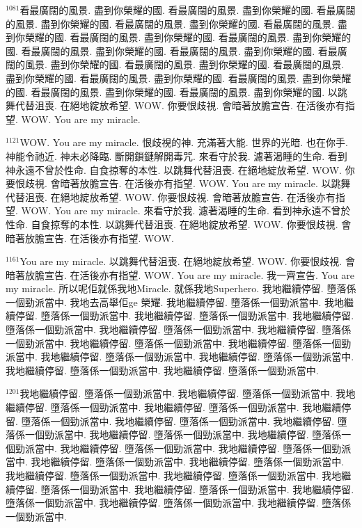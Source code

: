 \documentclass{book}
\begin{document}
$^{1081}$看最廣闊的風景.
盡到你榮耀的國.
看最廣闊的風景.
盡到你榮耀的國.
看最廣闊的風景.
盡到你榮耀的國.
看最廣闊的風景.
盡到你榮耀的國.
看最廣闊的風景.
盡到你榮耀的國.
看最廣闊的風景.
盡到你榮耀的國.
看最廣闊的風景.
盡到你榮耀的國.
看最廣闊的風景.
盡到你榮耀的國.
看最廣闊的風景.
盡到你榮耀的國.
看最廣闊的風景.
盡到你榮耀的國.
看最廣闊的風景.
盡到你榮耀的國.
看最廣闊的風景.
盡到你榮耀的國.
看最廣闊的風景.
盡到你榮耀的國.
看最廣闊的風景.
盡到你榮耀的國.
看最廣闊的風景.
盡到你榮耀的國.
看最廣闊的風景.
盡到你榮耀的國.
以跳舞代替沮喪.
在絕地綻放希望.
WOW.
你要恨歧視.
會暗著放膽宣告.
在活後亦有指望.
WOW.
You are my miracle.

$^{1121}$WOW.
You are my miracle.
恨歧視的神.
充滿著大能.
世界的光暗.
也在你手.
神能令祂近.
神未必降臨.
斷開鎖鏈解開毒咒.
來看守於我.
濾著渴睡的生命.
看到神永遠不曾於性命.
自食掠奪的本性.
以跳舞代替沮喪.
在絕地綻放希望.
WOW.
你要恨歧視.
會暗著放膽宣告.
在活後亦有指望.
WOW.
You are my miracle.
以跳舞代替沮喪.
在絕地綻放希望.
WOW.
你要恨歧視.
會暗著放膽宣告.
在活後亦有指望.
WOW.
You are my miracle.
來看守於我.
濾著渴睡的生命.
看到神永遠不曾於性命.
自食掠奪的本性.
以跳舞代替沮喪.
在絕地綻放希望.
WOW.
你要恨歧視.
會暗著放膽宣告.
在活後亦有指望.
WOW.

$^{1161}$You are my miracle.
以跳舞代替沮喪.
在絕地綻放希望.
WOW.
你要恨歧視.
會暗著放膽宣告.
在活後亦有指望.
WOW.
You are my miracle.
我一齊宣告.
You are my miracle.
所以呢佢就係我地Miracle.
就係我地Superhero.
我地繼續停留.
墮落係一個勁派當中.
我地去高舉佢ge 榮耀.
我地繼續停留.
墮落係一個勁派當中.
我地繼續停留.
墮落係一個勁派當中.
我地繼續停留.
墮落係一個勁派當中.
我地繼續停留.
墮落係一個勁派當中.
我地繼續停留.
墮落係一個勁派當中.
我地繼續停留.
墮落係一個勁派當中.
我地繼續停留.
墮落係一個勁派當中.
我地繼續停留.
墮落係一個勁派當中.
我地繼續停留.
墮落係一個勁派當中.
我地繼續停留.
墮落係一個勁派當中.
我地繼續停留.
墮落係一個勁派當中.
我地繼續停留.
墮落係一個勁派當中.

$^{1201}$我地繼續停留.
墮落係一個勁派當中.
我地繼續停留.
墮落係一個勁派當中.
我地繼續停留.
墮落係一個勁派當中.
我地繼續停留.
墮落係一個勁派當中.
我地繼續停留.
墮落係一個勁派當中.
我地繼續停留.
墮落係一個勁派當中.
我地繼續停留.
墮落係一個勁派當中.
我地繼續停留.
墮落係一個勁派當中.
我地繼續停留.
墮落係一個勁派當中.
我地繼續停留.
墮落係一個勁派當中.
我地繼續停留.
墮落係一個勁派當中.
我地繼續停留.
墮落係一個勁派當中.
我地繼續停留.
墮落係一個勁派當中.
我地繼續停留.
墮落係一個勁派當中.
我地繼續停留.
墮落係一個勁派當中.
我地繼續停留.
墮落係一個勁派當中.
我地繼續停留.
墮落係一個勁派當中.
我地繼續停留.
墮落係一個勁派當中.
我地繼續停留.
墮落係一個勁派當中.
我地繼續停留.
墮落係一個勁派當中.
\end{document}
